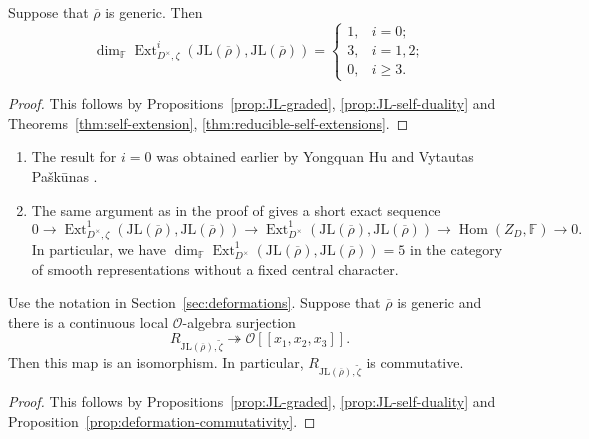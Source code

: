 \documentclass[11pt,a4paper]{article} %
\def\FF{\mathbb{F}}
\def\cO{\mathcal{O}}
\def\dim{\operatorname{dim}}
\def\Ext{\operatorname{Ext}} %
\def\Hom{\operatorname{Hom}}
\def\rhobar{\overline{\rho}}
\begin{document}
\begin{theorem}\label{thm:JL-self-extensions}
    Suppose that $\rhobar$ is generic. Then
    \[
    \dim_\FF\Ext^i_{D^\times,\zeta}
    \left(\mathrm{JL}(\rhobar),\mathrm{JL}(\rhobar)\right)
    =\begin{cases}
    1,&i=0;\\
    3,&i=1,2;\\
    0,&i\ge3.
    \end{cases}
    \]
\end{theorem}

\begin{proof}
    This follows by Propositions~\ref{prop:JL-graded}, \ref{prop:JL-self-duality} and Theorems~\ref{thm:self-extension}, \ref{thm:reducible-self-extensions}.
\end{proof}

\begin{remark}
    \begin{enumerate}
        \item The result for $i=0$ was obtained earlier by Yongquan Hu and Vytautas Pa\v{s}k\={u}nas \cite{HP}.
        \item The same argument as in the proof of \cite[Proposition 8.1]{Pas10} gives a short exact sequence
        \[
        0\longrightarrow\Ext^1_{D^\times,\zeta}(\mathrm{JL}(\rhobar),\mathrm{JL}(\rhobar))\longrightarrow\Ext^1_{D^\times}(\mathrm{JL}(\rhobar),\mathrm{JL}(\rhobar))\longrightarrow\Hom(Z_D,\FF)\longrightarrow0.
        \]
        In particular, we have $\dim_\FF\Ext^1_{D^\times}(\mathrm{JL}(\rhobar),\mathrm{JL}(\rhobar))=5$ in the category of smooth representations without a fixed central character.
    \end{enumerate}
\end{remark}


\begin{theorem}\label{thm:commutativity}
    Use the notation in Section~\ref{sec:deformations}. Suppose that $\rhobar$ is generic and there is a continuous local $\cO$-algebra surjection
    \[
    R_{\mathrm{JL}(\rhobar),\widetilde\zeta}\twoheadrightarrow
    \cO[[x_1,x_2,x_3]].
    \]
    Then this map is an isomorphism. In particular, $R_{\mathrm{JL}(\rhobar),\widetilde\zeta}$ is commutative.
\end{theorem}

\begin{proof}
    This follows by Propositions~\ref{prop:JL-graded}, \ref{prop:JL-self-duality} and Proposition~\ref{prop:deformation-commutativity}.
\end{proof}



\end{document}
